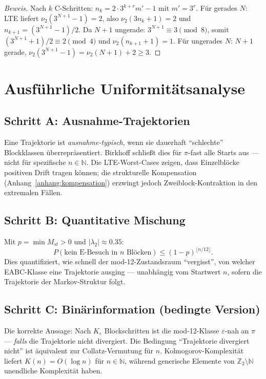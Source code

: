 \documentclass[12pt,a4paper]{article}
\newenvironment{beweis}{\begin{proof}[Beweis]}{\end{proof}}
\newcommand{\vii}{\nu_2}
\newcommand{\N}{\mathbb{N}}
\newcommand{\Ztwo}{\mathbb{Z}_2}
\begin{document}
\begin{beweis}
Nach $k$ C-Schritten: $n_k = 2\cdot 3^{k+r} m' - 1$ mit $m'=3^r$.
Für gerades $N$: LTE liefert $\vii(3^{N+1}-1)=2$, also
$\vii(3n_k+1)=2$ und $n_{k+1}=(3^{N+1}-1)/2$.
Da $N+1$ ungerade: $3^{N+1} \equiv 3 \pmod 8$, somit
$(3^{N+1}+1)/2 \equiv 2 \pmod 4$ und $\vii(n_{k+1}+1)=1$.
Für ungerades $N$: $N+1$ gerade, $\vii(3^{N+1}-1)=\vii(N+1)+2\geq 3$.
\end{beweis}

\section{Ausführliche Uniformitätsanalyse}
\label{anhang:uniformitaet}

\subsection{Schritt A: Ausnahme-Trajektorien}

Eine Trajektorie ist \emph{ausnahme-typisch}, wenn sie dauerhaft ``schlechte''
Blockklassen überrepräsentiert. Birkhoff schließt dies für $\pi$-fast alle
Starts aus --- nicht für spezifische $n\in\N$. Die LTE-Worst-Cases zeigen,
dass Einzelblöcke positiven Drift tragen können; die strukturelle
Kompensation (Anhang~\ref{anhang:kompensation}) erzwingt jedoch
Zweiblock-Kontraktion in den extremalen Fällen.

\subsection{Schritt B: Quantitative Mischung}

Mit $p=\min M_{st}>0$ und $|\lambda_2|\approx 0.35$:
\[
  P(\text{kein E-Besuch in }n\text{ Blöcken})\leq (1-p)^{\lfloor n/12\rfloor}.
\]
Dies quantifiziert, wie schnell der mod-12-Zustandsraum ``vergisst'',
von welcher EABC-Klasse eine Trajektorie ausging --- unabhängig vom
Startwert $n$, sofern die Trajektorie der Markov-Struktur folgt.

\subsection{Schritt C: Binärinformation (bedingte Version)}

Die korrekte Aussage: Nach $K_\varepsilon$ Blockschritten ist die mod-12-Klasse
$\varepsilon$-nah an $\pi$ --- \emph{falls} die Trajektorie nicht divergiert.
Die Bedingung ``Trajektorie divergiert nicht'' ist äquivalent zur
Collatz-Vermutung für $n$. Kolmogorov-Komplexität liefert $K(n)=O(\log n)$
für $n\in\N$, während generische Elemente von $\Ztwo\setminus\N$ unendliche
Komplexität haben.
\end{document}
